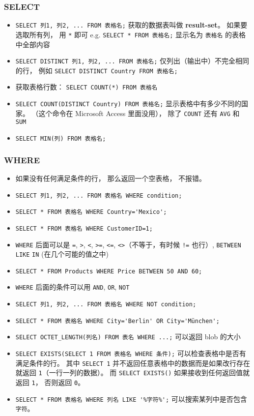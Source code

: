 \subsubsection{SELECT}
\begin{itemize}
\item \verb`SELECT 列1, 列2, ... FROM 表格名;` 获取的数据表叫做 \textbf{result-set}。 如果要选取所有列， 用 \verb`*` 即可 e.g. \verb`SELECT * FROM 表格名;` 显示名为 \verb|表格名| 的表格中全部内容
\item \verb`SELECT DISTINCT 列1, 列2, ... FROM 表格名;` 仅列出（输出中）不完全相同的行， 例如 \verb`SELECT DISTINCT Country FROM 表格名;`
\item 获取表格行数： \verb`SELECT COUNT(*) FROM 表格名`
\item \verb`SELECT COUNT(DISTINCT Country) FROM 表格名;` 显示表格中有多少不同的国家。 （这个命令在 Microsoft Access 里面没用）， 除了 \verb|COUNT| 还有 \verb|AVG| 和 \verb|SUM|
\item \verb|SELECT MIN(列) FROM 表格名;|
\end{itemize}

\subsubsection{WHERE}
\begin{itemize}
\item 如果没有任何满足条件的行， 那么返回一个空表格， 不报错。
\item \verb`SELECT 列1, 列2, ... FROM 表格名 WHERE condition;`
\item \verb`SELECT * FROM 表格名 WHERE Country='Mexico';`
\item \verb`SELECT * FROM 表格名 WHERE CustomerID=1;`
\item \verb`WHERE` 后面可以是 \verb`=`, \verb`>`, \verb`<`, \verb`>=`, \verb`<=`, \verb`<>`（不等于，有时候 \verb`!=` 也行）, \verb`BETWEEN` \verb`LIKE` \verb`IN` (在几个可能的值之中)
\item \verb`SELECT * FROM Products WHERE Price BETWEEN 50 AND 60;`
\item \verb`WHERE` 后面的条件可以用 \verb`AND`, \verb`OR`, \verb`NOT`
\item \verb`SELECT 列1, 列2, ... FROM 表格名 WHERE NOT condition;`
\item \verb`SELECT * FROM 表格名 WHERE City='Berlin' OR City='München';`
\item \verb`SELECT OCTET_LENGTH(列名) FROM 表名 WHERE ...;` 可以返回 blob 的大小
\item \verb|SELECT EXISTS(SELECT 1 FROM 表格名 WHERE 条件);| 可以检查表格中是否有满足条件的行。 其中 \verb|SELECT 1| 并不返回任意表格中的数据而是如果改行存在就返回 \verb|1|（一行一列的数据）。 而 \verb|SELECT EXISTS()| 如果接收到任何返回值就返回 \verb|1|， 否则返回 \verb|0|。
\item \verb|SELECT * FROM 表格名 WHERE 列名 LIKE '%字符%';| 可以搜索某列中是否包含 \verb|字符|。
\end{itemize}

